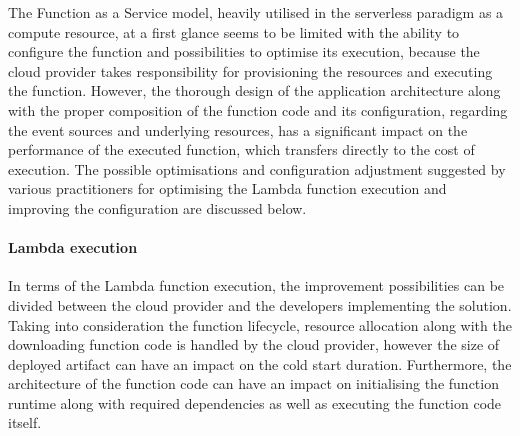 The Function as a Service model, heavily utilised in the serverless paradigm as a compute resource, at a first glance seems to be limited with the ability to configure the function and possibilities to optimise its execution, because the cloud provider takes responsibility for provisioning the resources and executing the function.
However, the thorough design of the application architecture along with the proper composition of the function code and its configuration, regarding the event sources and underlying resources, has a significant impact on the performance of the executed function, which transfers directly to the cost of execution.
The possible optimisations and configuration adjustment suggested by various practitioners for optimising the Lambda function execution and improving the configuration are discussed below.

\paragraph{Lambda execution}

In terms of the Lambda function execution, the improvement possibilities can be divided between the cloud provider and the developers implementing the solution. Taking into consideration the function lifecycle, resource allocation along with the downloading function code is handled by the cloud provider, however the size of deployed artifact can have an impact on the cold start duration. Furthermore, the architecture of the function code can have an impact on initialising the function runtime along with required dependencies as well as executing the function code itself.

